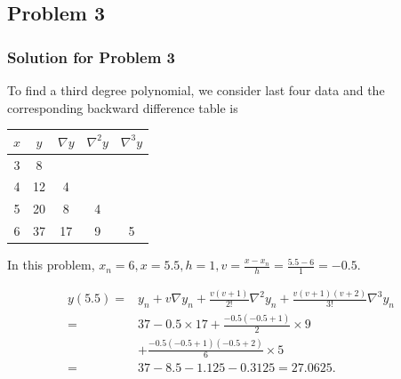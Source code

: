 \documentclass{beamer}
\begin{document}
\subsection{Problem 3}
\begin{frame}
\frametitle{Solution for Problem 3}
To find a third degree polynomial, we consider last four data and the corresponding backward difference table is

\begin{center}
\begin{tabular}{|c|c|c|c|c|}
\hline
$x$ & $y$ & $\nabla y$ & $\nabla^{2} y$ & $\nabla^{3} y$ \\
\hline
3 & 8 &  &  &  \\
\hline
4 & 12 & 4 &  &  \\
\hline
5 & 20 & 8 & 4 &  \\
\hline
6 & 37 & 17 & 9 & 5 \\
\hline
\end{tabular}
\end{center}

In this problem, $x_{n}=6, x=5.5, h=1, v=\frac{x-x_{n}}{h}=\frac{5.5-6}{1}=-0.5$.

$$
\begin{aligned}
y(5.5)= & y_{n}+v \nabla y_{n}+\frac{v(v+1)}{2 !} \nabla^{2} y_{n}+\frac{v(v+1)(v+2)}{3 !} \nabla^{3} y_{n} \\
= & 37-0.5 \times 17+\frac{-0.5(-0.5+1)}{2} \times 9 \\
& +\frac{-0.5(-0.5+1)(-0.5+2)}{6} \times 5 \\
= & 37-8.5-1.125-0.3125 
= 27.0625 .
\end{aligned}
$$
\end{frame}
\end{document}
